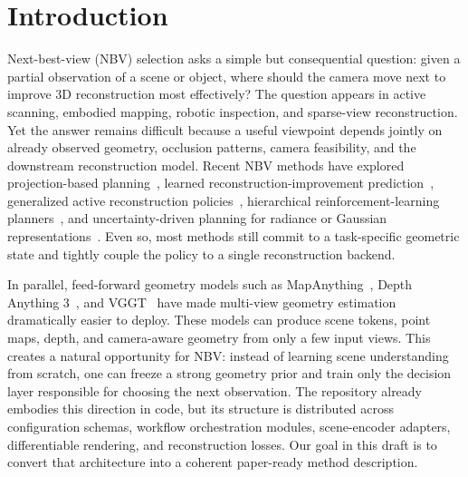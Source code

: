 \section{Introduction}
\label{sec:intro}

Next-best-view (NBV) selection asks a simple but consequential question: given a partial observation of a scene or object, where should the camera move next to improve 3D reconstruction most effectively? The question appears in active scanning, embodied mapping, robotic inspection, and sparse-view reconstruction. Yet the answer remains difficult because a useful viewpoint depends jointly on already observed geometry, occlusion patterns, camera feasibility, and the downstream reconstruction model. Recent NBV methods have explored projection-based planning~\cite{jia2025pbnbv}, learned reconstruction-improvement prediction~\cite{frahm2025vinnbv}, generalized active reconstruction policies~\cite{chen2024gennbv}, hierarchical reinforcement-learning planners~\cite{lu2025hestia}, and uncertainty-driven planning for radiance or Gaussian representations~\cite{xie2025gaussmi,ye2024pvprecon}. Even so, most methods still commit to a task-specific geometric state and tightly couple the policy to a single reconstruction backend.

In parallel, feed-forward geometry models such as MapAnything~\cite{keetha2025mapanything}, Depth Anything 3~\cite{lin2025depthanything3}, and VGGT~\cite{wang2025vggt} have made multi-view geometry estimation dramatically easier to deploy. These models can produce scene tokens, point maps, depth, and camera-aware geometry from only a few input views. This creates a natural opportunity for NBV: instead of learning scene understanding from scratch, one can freeze a strong geometry prior and train only the decision layer responsible for choosing the next observation. The \codebase repository already embodies this direction in code, but its structure is distributed across configuration schemas, workflow orchestration modules, scene-encoder adapters, differentiable rendering, and reconstruction losses. Our goal in this draft is to convert that architecture into a coherent paper-ready method description.

